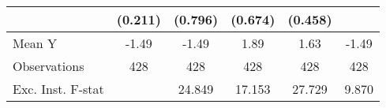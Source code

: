 {\begin{tabular}{l*{5}{c}}
            &     (0.211)         &     (0.796)         &     (0.674)         &     (0.458)         &                     \\
\midrule
Mean Y      &       -1.49         &       -1.49         &        1.89         &        1.63         &       -1.49         \\
Observations&         428         &         428         &         428         &         428         &         428         \\
Exc. Inst. F-stat&                     &      24.849         &      17.153         &      27.729         &       9.870         \\
\bottomrule
\end{tabular}
}
